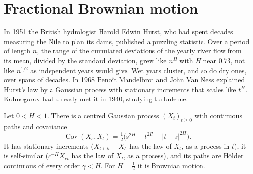 \section{Fractional Brownian motion}\label{sec:fbm}

In 1951 the British hydrologist Harold Edwin Hurst, who had spent decades measuring the Nile to plan its dams, published a puzzling statistic. Over a period of length $n$, the range of the cumulated deviations of
the yearly river flow from its mean, divided by the standard deviation, grew like $n^H$ with $H$ near $0.73$, not like $n^{1/2}$ as independent years would give. Wet years cluster, and so do dry ones, over spans of
decades. In 1968 Beno\^it Mandelbrot and John Van Ness explained Hurst's law by a Gaussian process with stationary increments that scales like $t^H$. Kolmogorov had already met it in 1940, studying turbulence.

\begin{theorem}\label{thm:fbm}
Let $0<H<1$. There is a centred Gaussian process $(X_t)_{t\ge0}$ with continuous paths and covariance
\[
\operatorname{Cov}(X_s,X_t)=\tfrac12\bigl(s^{2H}+t^{2H}-|t-s|^{2H}\bigr).
\]
It has stationary increments ($X_{t+h}-X_h$ has the law of $X_t$, as a process in $t$), it is self-similar ($c^{-H}X_{ct}$ has the law of $X_t$, as a process), and its paths are H\"older continuous of every order $\gamma<H$.
For $H=\frac12$ it is Brownian motion.
\end{theorem}

